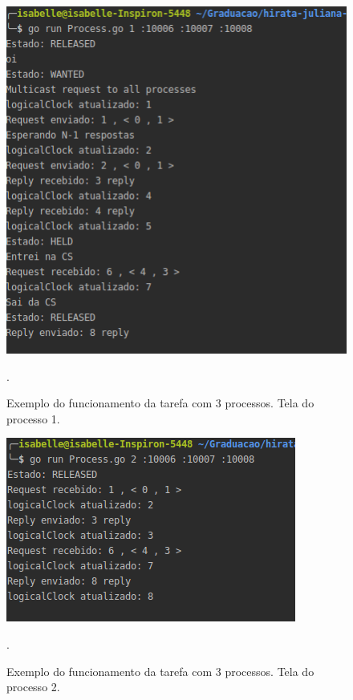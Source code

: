 \documentclass[conference]{IEEEtran}
\begin{document}
\begin{figure}[H]
\centering
\centerline{\includegraphics[scale=0.5]{imagens/ex1-proc1.png}}
\caption{Exemplo do funcionamento da tarefa com 3 processos. Tela do processo 1.}.
\label{ex1-proc1}
\end{figure}

\begin{figure}[H]
\centering
\centerline{\includegraphics[scale=0.5]{imagens/ex1-proc2.png}}
\caption{Exemplo do funcionamento da tarefa com 3 processos. Tela do processo 2.}.
\label{ex1-proc2}
\end{figure}
\end{document}

